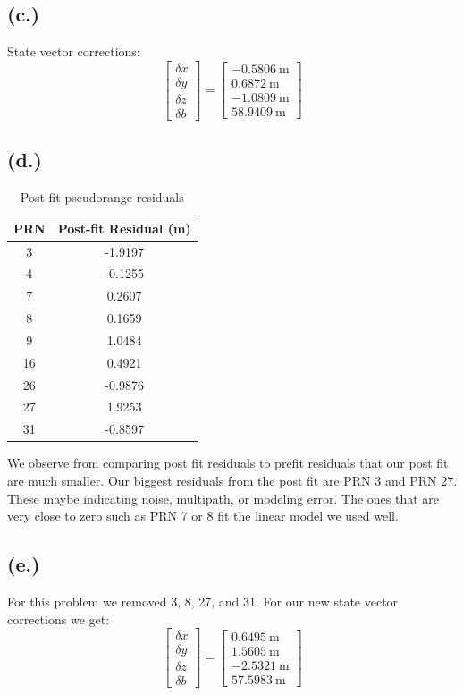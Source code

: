 \documentclass[11pt]{article}
\begin{document}
\subsection*{(c.)}
State vector corrections:
\[
\begin{bmatrix}
\delta x \\
\delta y \\
\delta z \\
\delta b
\end{bmatrix}
=
\begin{bmatrix}
-0.5806~\mathrm{m} \\
0.6872~\mathrm{m} \\
-1.0809~\mathrm{m} \\
58.9409~\mathrm{m}
\end{bmatrix}
\]
\pagebreak
\subsection*{(d.)}
\begin{table}[h!]
    \centering
    \begin{tabular}{|c|c|}
        \hline
        \textbf{PRN} & \textbf{Post-fit Residual (m) } \\ \hline
        3  & -1.9197 \\ \hline
        4  & -0.1255 \\ \hline
        7  &  0.2607 \\ \hline
        8  &  0.1659 \\ \hline
        9  &  1.0484 \\ \hline
        16 &  0.4921 \\ \hline
        26 & -0.9876 \\ \hline
        27 &  1.9253 \\ \hline
        31 & -0.8597 \\ \hline
    \end{tabular}
    \caption{Post-fit pseudorange residuals}
    \label{tab:postfit_residuals}
\end{table}

\hspace*{2em}We observe from comparing post fit residuals to prefit residuals that our post fit are much smaller. Our biggest residuals from the post fit are PRN 3 and PRN 27. These maybe indicating noise, multipath, or modeling error. The ones that are very close to zero such as PRN 7 or 8 fit the linear model we used well.
\subsection*{(e.)}
 For this problem we removed 3, 8, 27, and 31.
For our new state vector corrections we get:
 \[
\begin{bmatrix}
\delta x \\
\delta y \\
\delta z \\
\delta b
\end{bmatrix}
=
\begin{bmatrix}
0.6495~\mathrm{m} \\
1.5605~\mathrm{m} \\
-2.5321~\mathrm{m} \\
 57.5983~\mathrm{m}
\end{bmatrix}
\]
\end{document}
